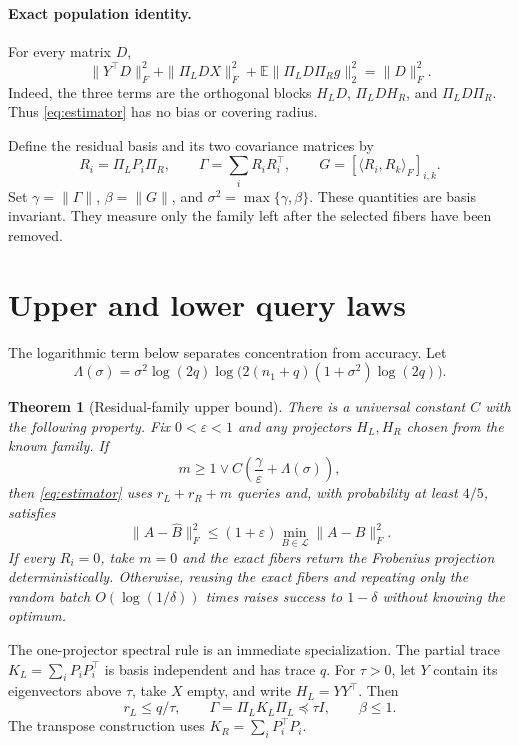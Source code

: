 \documentclass{article}
\newtheorem{theorem}{Theorem}
\theoremstyle{remark}
\newcommand{\E}{\mathbb E}
\newcommand{\cL}{\mathcal L}
\newcommand{\eps}{\varepsilon}
\newcommand{\1}{\mathbf 1}
\begin{document}
\paragraph{Exact population identity.}
For every matrix $D$,
\begin{equation}
 \|Y^\top D\|_F^2+\|\Pi_LDX\|_F^2+
 \E\|\Pi_LD\Pi_Rg\|_2^2=\|D\|_F^2.
 \label{eq:population}
\end{equation}
Indeed, the three terms are the orthogonal blocks $H_LD$, $\Pi_LDH_R$, and $\Pi_LD\Pi_R$.  Thus \eqref{eq:estimator} has no bias or covering radius.

Define the residual basis and its two covariance matrices by
\begin{equation}
 R_i=\Pi_LP_i\Pi_R,\qquad
 \Gamma=\sum_iR_iR_i^\top,\qquad
 G=[\langle R_i,R_k\rangle_F]_{i,k}.
 \label{eq:residual-profile}
\end{equation}
Set $\gamma=\|\Gamma\|$, $\beta=\|G\|$, and $\sigma^2=\max\{\gamma,\beta\}$.  These quantities are basis invariant.  They measure only the family left after the selected fibers have been removed.

\section{Upper and lower query laws}
\label{sec:results}

The logarithmic term below separates concentration from accuracy.  Let \[ \Lambda(\sigma)=\sigma^2\log(2q) \log\!\bigl(2(n_1+q)(1+\sigma^2)\log(2q)\bigr). \]

\begin{theorem}[Residual-family upper bound]
\label{thm:instance}
There is a universal constant $C$ with the following property.  Fix $0<\eps<1$ and any projectors $H_L,H_R$ chosen from the known family.  If
\begin{equation}
 m\ge 1\vee C\left(\frac{\gamma}{\eps}+\Lambda(\sigma)\right),
 \label{eq:m-condition}
\end{equation}
then \eqref{eq:estimator} uses $r_L+r_R+m$ queries and, with probability at least $4/5$, satisfies \[ \|A-\widehat B\|_F^2\le(1+\eps) \min_{B\in\cL}\|A-B\|_F^2. \] If every $R_i=0$, take $m=0$ and the exact fibers return the Frobenius projection deterministically.  Otherwise, reusing the exact fibers and repeating only the random batch $O(\log(1/\delta))$ times raises success to $1-\delta$ without knowing the optimum.
\end{theorem}

The one-projector spectral rule is an immediate specialization.  The partial trace $K_L=\sum_iP_iP_i^\top$ is basis independent and has trace $q$.  For $\tau>0$, let $Y$ contain its eigenvectors above $\tau$, take $X$ empty, and write $H_L=YY^\top$.  Then
\begin{equation}
 r_L\le q/\tau,\qquad \Gamma=\Pi_LK_L\Pi_L\preceq\tau I,
 \qquad \beta\le1.
 \label{eq:spectral-split}
\end{equation}
The transpose construction uses $K_R=\sum_iP_i^\top P_i$.
\end{document}
